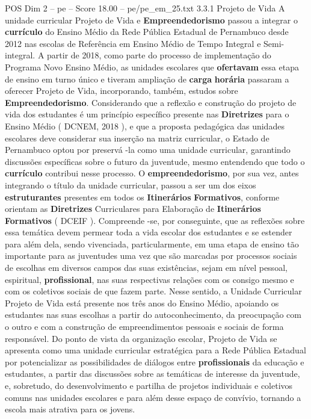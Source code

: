 \begin{textsample}{POS Dim 2 – pe – Score 18.00 – pe/pe\_em\_25.txt}  \label{ex:f2_pos_257}
3.3.1 Projeto de Vida A unidade curricular Projeto de Vida e \textbf{Empreendedorismo} passou a integrar o \textbf{currículo} do Ensino Médio da Rede Pública Estadual de Pernambuco desde 2012 nas escolas de Referência em Ensino Médio de Tempo Integral e Semi-integral.
A partir de 2018, como parte do processo de implementação do Programa Novo Ensino Médio, as unidades escolares que \textbf{ofertavam} essa etapa de ensino em turno único e tiveram ampliação de \textbf{carga} \textbf{horária} passaram a oferecer Projeto de Vida, incorporando, também, estudos sobre \textbf{Empreendedorismo}.
Considerando que a reflexão e construção do projeto de vida dos estudantes é um princípio específico presente nas \textbf{Diretrizes} para o Ensino Médio ( DCNEM, 2018 ), e que a proposta pedagógica das unidades escolares deve considerar sua inserção na matriz curricular, o Estado de Pernambuco optou por preservá -la como uma unidade curricular, garantindo discussões específicas sobre o futuro da juventude, mesmo entendendo que todo o \textbf{currículo} contribui nesse processo.
O \textbf{empreendedorismo}, por sua vez, antes integrando o título da unidade curricular, passou a ser um dos eixos \textbf{estruturantes} presentes em todos os \textbf{Itinerários} \textbf{Formativos}, conforme orientam as \textbf{Diretrizes} Curriculares para Elaboração de \textbf{Itinerários} \textbf{Formativos} ( DCEIF ).
Compreende -se, por conseguinte, que as reflexões sobre essa temática devem permear toda a vida escolar dos estudantes e se estender para além dela, sendo vivenciada, particularmente, em uma etapa de ensino tão importante para as juventudes uma vez que são marcadas por processos sociais de escolhas em diversos campos das suas existências, sejam em nível pessoal, espiritual, \textbf{profissional}, nas suas respectivas relações com os consigo mesmo e com os coletivos sociais de que fazem parte.
Nesse sentido, a Unidade Curricular Projeto de Vida está presente nos três anos do Ensino Médio, apoiando os estudantes nas suas escolhas a partir do autoconhecimento, da preocupação com o outro e com a construção de empreendimentos pessoais e sociais de forma responsável.
Do ponto de vista da organização escolar, Projeto de Vida se apresenta como uma unidade curricular estratégica para a Rede Pública Estadual por potencializar as possibilidades de diálogos entre \textbf{profissionais} da educação e estudantes, a partir das discussões sobre as temáticas de interesse da juventude, e, sobretudo, do desenvolvimento e partilha de projetos individuais e coletivos comuns nas unidades escolares e para além desse espaço de convívio, tornando a escola mais atrativa para os jovens.

\end{textsample}
